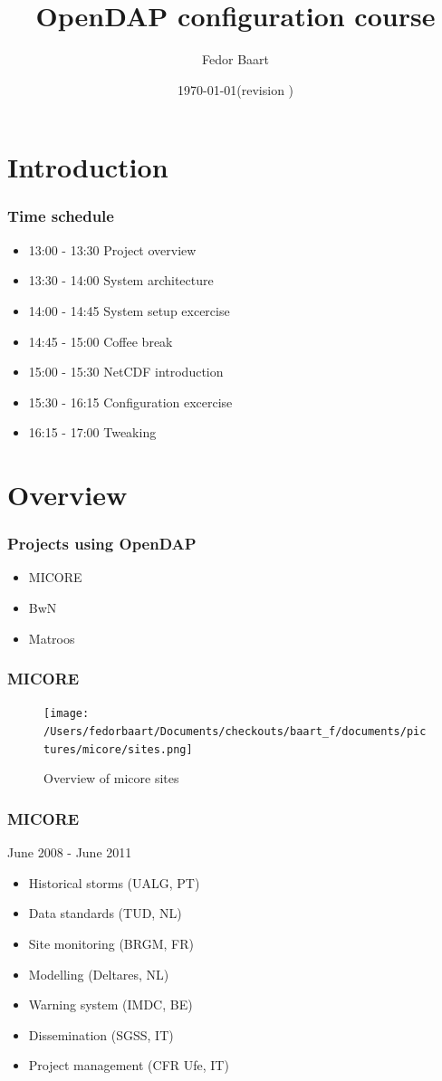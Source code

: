 \documentclass[]{beamer}
\title{OpenDAP configuration course}
\author{Fedor Baart}
\date{\today  (revision \svnInfoRevision)}
\begin{document}
\frame{\titlepage}


\section[Outline]{}
\frame{\tableofcontents}

\section{Introduction}
\frame
{
  \frametitle{Time schedule}
  \begin{itemize}
  \item{13:00 - 13:30} Project overview
  \item{13:30 - 14:00} System architecture
  \item{14:00 - 14:45} System setup excercise
  \item{14:45 - 15:00} Coffee break
  \item{15:00 - 15:30} NetCDF introduction
  \item{15:30 - 16:15} Configuration excercise
  \item{16:15 - 17:00} Tweaking
  \end{itemize}


}
\section{Overview}
\frame
{
  \frametitle{Projects using OpenDAP}
  \begin{itemize}
  \item MICORE
  \item BwN
  \item Matroos
  \end{itemize}
}
\frame
{
  \frametitle{MICORE}
  \begin{figure}[htbp]
   \centering
   \texttt{[image: /Users/fedorbaart/Documents/checkouts/baart\_f/documents/pictures/micore/sites.png]} %
   \caption{Overview of micore sites}
   \label{fig:processes}
\end{figure}
}

\frame
{
  \frametitle{MICORE}
  June 2008 - June 2011
  \begin{itemize}
  \item Historical storms (UALG, PT)
  \item Data standards (TUD, NL)
  \item Site monitoring (BRGM, FR)
  \item Modelling (Deltares, NL)
  \item Warning system (IMDC, BE)
  \item Dissemination (SGSS, IT)
  \item Project management (CFR Ufe, IT)
  \end{itemize}
}
\end{document}
